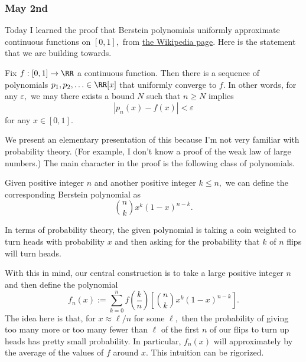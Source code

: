 \subsubsection{May 2nd}
Today I learned the proof that Berstein polynomials uniformly approximate continuous functions on $[0,1],$ from \href{https://web.archive.org/web/20210421224053/https://en.wikipedia.org/wiki/Bernstein_polynomial}{the Wikipedia page}. Here is the statement that we are building towards.
\begin{theorem}
    Fix $f:[0,1]\to\RR$ a continuous function. Then there is a sequence of polynomials $p_1,p_2,\ldots\in\RR[x]$ that uniformly converge to $f.$ In other words, for any $\varepsilon,$ we may there exists a bound $N$ such that $n\ge N$ implies
    \[|p_n(x)-f(x)|<\varepsilon\]
    for any $x\in[0,1].$
\end{theorem}
We present an elementary presentation of this because I'm not very familiar with probability theory. (For example, I don't know a proof of the weak law of large numbers.) The main character in the proof is the following class of polynomials.
\begin{definition}
    Given positive integer $n$ and another positive integer $k\le n,$ we can define the corresponding Berstein polynomial as
    \[\binom nkx^k(1-x)^{n-k}.\]
\end{definition}
In terms of probability theory, the given polynomial is taking a coin weighted to turn heads with probability $x$ and then asking for the probability that $k$ of $n$ flips will turn heads.

With this in mind, our central construction is to take a large positive integer $n$ and then define the polynomial
\[f_n(x):=\sum_{k=0}^nf\left(\frac kn\right)\left[\binom nkx^k(1-x)^{n-k}\right].\]
The idea here is that, for $x\approx\ell/n$ for some $\ell,$ then the probability of giving too many more or too many fewer than $\ell$ of the first $n$ of our flips to turn up heads has pretty small probability. In particular, $f_n(x)$ will approximately by the average of the values of $f$ around $x.$ This intuition can be rigorized.

